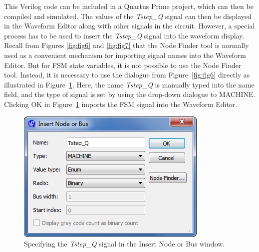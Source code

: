 \documentclass[11pt, twoside, pdftex]{article}
\begin{document}
This Verilog code can be included in a Quartus Prime project, 
which can then be compiled and simulated. The values of the {\it Tstep\_Q} signal can then 
be displayed in the Waveform Editor along with other signals in the circuit. However, a special 
process has to be used to insert the {\it Tstep\_Q} signal into the waveform display. Recall 
from Figures \ref{fig:fig6} and \ref{fig:fig7} that the {\sf Node Finder} tool is normally used 
as a convenient mechanism for importing signal names into the Waveform Editor. But for FSM 
state variables, it is not possible to use the {\sf Node Finder} tool. Instead, it is necessary 
to use the dialogue from Figure~\ref{fig:fig6} directly as illustrated in Figure~\ref{fig:fig29}.
Here, the name {\it Tstep\_Q} is manually typed into the name field, and
the type of signal is set by using the drop-down dialogue to {\sf MACHINE}. Clicking {\sf OK} 
in Figure~\ref{fig:fig29} imports the FSM signal into the Waveform Editor.
\begin{figure}[H]
   \begin{center}
      \includegraphics[scale=0.65]{figures/appendix/figure29.png}
   \caption{Specifying the {\it Tstep\_Q} signal in the {\sf Insert Node or Bus} window.} 
	 \label{fig:fig29}
	 \end{center}
\end{figure} 	
\end{document}
